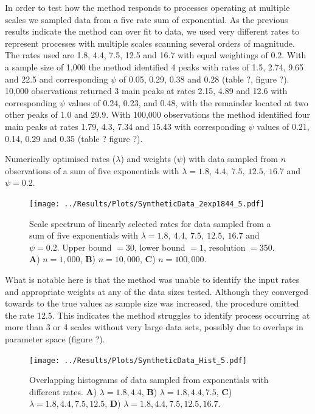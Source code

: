 \documentclass[11pt,usenames,dvipsnames]{article}
\begin{document}
In order to test how the method responds to processes operating at multiple scales we sampled data from a five rate sum of exponential. As the previous results indicate the method can over fit to data, we used very different rates to represent processes with multiple scales scanning several orders of magnitude. The rates used are 1.8, 4.4, 7.5, 12.5 and 16.7 with equal weightings of 0.2. With a sample size of 1,000 the method identified 4 peaks with rates of 1.5, 2.74, 9.65 and 22.5 and corresponding $\psi$ of 0.05, 0.29, 0.38 and 0.28 (table ?, figure ?). 10,000 observations returned 3 main peaks at rates 2.15, 4.89 and 12.6 with corresponding $\psi$ values of 0.24, 0.23, and 0.48, with the remainder located at two other peaks of 1.0 and 29.9. With 100,000 observations the method identified four main peaks at rates 1.79, 4.3, 7.34 and 15.43 with corresponding $\psi$ values of 0.21, 0.14, 0.29 and 0.35 (table ? figure ?). 

\begin{table}[H]
	\centering
	\caption{Numerically optimised rates ($\lambda$) and weights ($\psi$) with data sampled from $n$ observations of a sum of five exponentials with $\lambda = 1.8,\ 4.4,\ 7.5,\ 12.5,\ 16.7$ and $\psi = 0.2$.}
	
\end{table}
\begin{figure}[H]
	\centering
	\texttt{[image: ../Results/Plots/SyntheticData\_2exp1844\_5.pdf]}
	\caption{Scale spectrum of linearly selected rates for data sampled from a sum of five exponentials with $\lambda = 1.8,\ 4.4,\ 7.5,\ 12.5,\ 16.7$ and $\psi = 0.2$. Upper bound $= 30$, lower bound $= 1$, resolution $= 350$. \textbf{A}) $n = 1,000$, \textbf{B}) $n = 10,000$,  \textbf{C}) $n = 100,000$.}
\end{figure}

What is notable here is that the method was unable to identify the input rates and appropriate weights at any of the data sizes tested. Although they converged towards to the true values as sample size was increased, the procedure omitted the rate 12.5. This indicates the method struggles to identify process occurring at more than 3 or 4 scales without very large data sets, possibly due to overlaps in parameter space (figure ?).

\begin{figure}[H]
	\centering
	\texttt{[image: ../Results/Plots/SyntheticData\_Hist\_5.pdf]}
	\caption{Overlapping histograms of data sampled from exponentials with different rates. \textbf{A}) $\lambda = 1.8, 4.4$, \textbf{B}) $\lambda = 1.8, 4.4, 7.5$, \textbf{C}) $\lambda = 1.8, 4.4, 7.5, 12.5$, \textbf{D}) $\lambda = 1.8, 4.4, 7.5, 12.5, 16.7$.}
\end{figure}
\end{document}
